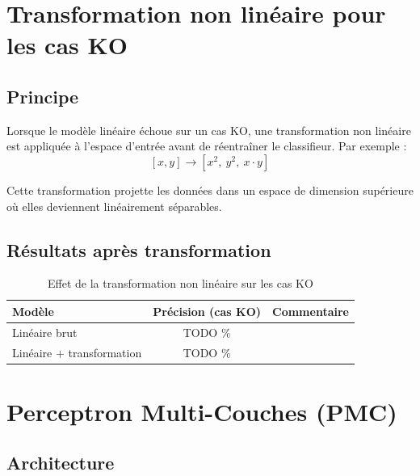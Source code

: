 \documentclass[12pt, a4paper]{report}
\begin{document}

\section{Transformation non linéaire pour les cas KO}

\subsection{Principe}


Lorsque le modèle linéaire échoue sur un cas KO, une transformation
non linéaire est appliquée à l'espace d'entrée avant de réentraîner
le classifieur. Par exemple :
\[
    [x, y] \longrightarrow [x^2,\ y^2,\ x \cdot y]
\]

Cette transformation projette les données dans un espace de dimension
supérieure où elles deviennent linéairement séparables.

\subsection{Résultats après transformation}


\begin{table}[H]
\centering
\begin{tabular}{lcc}
\toprule
\textbf{Modèle} & \textbf{Précision (cas KO)} & \textbf{Commentaire} \\
\midrule
Linéaire brut & TODO \% & \\
Linéaire + transformation & TODO \% & \\
\bottomrule
\end{tabular}
\caption{Effet de la transformation non linéaire sur les cas KO}
\end{table}

\section{Perceptron Multi-Couches (PMC)}

\subsection{Architecture}
\end{document}
